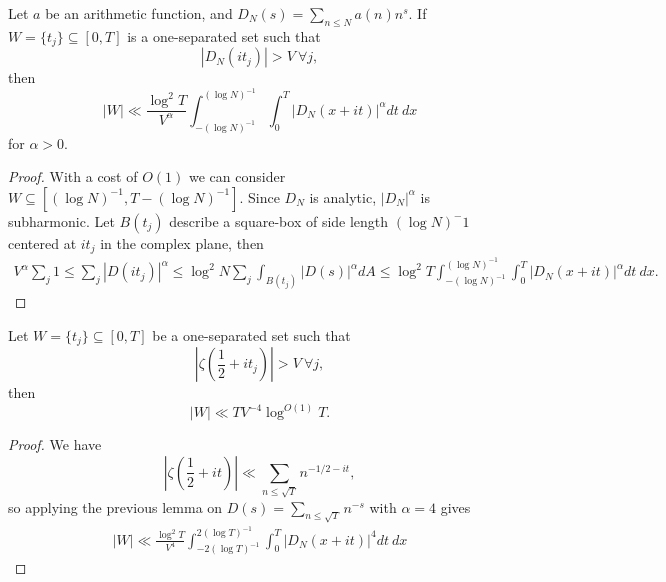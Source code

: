 \begin{lemma}
    Let $a$ be an arithmetic function, and $D_N(s)=\sum_{n\leq N}a(n)n^{s}.$
    If $W = \{t_j\}\subseteq [0,T]$ is a one-separated set such that \[
        |D_N(it_j)| > V \ \forall j,
    \]
    then \[
        |W|\ll \frac{\log^2 T}{V^\alpha} \int_{-(\log N)^{-1}}^{(\log N)^{-1}}
        \int_{0}^{T} |D_N(x+it)|^\alpha dt \ dx
        \]
    for $\alpha > 0$.
\end{lemma}
\begin{proof}
    With a cost of $O(1)$ we can consider $W\subseteq [(\log N)^{-1}, T-(\log N)^{-1}]$.
    Since $D_N$ is analytic, $|D_N|^\alpha$ is subharmonic. Let $B(t_j)$ describe a square-box of side length $(\log N)^-1$ centered at $it_j$ in the complex plane, then \begin{align*}
        V^\alpha \sum_{j} 1 \leq \sum_{j}|D(it_j)|^\alpha \leq \log^2 N \sum_{j} \int_{B(t_j)} |D(s)|^\alpha dA \leq \log^2 T \int_{-(\log N)^{-1}}^{(\log N)^{-1}}
        \int_{0}^{T} |D_N(x+it)|^\alpha dt \ dx.
    \end{align*}
\end{proof}

\begin{corollary} \label{halflinebigvalue}
   Let $W = \{t_j\}\subseteq [0,T]$ be a one-separated set such that \[
        \left|\zeta\left(\frac{1}{2}+it_j\right)\right|>V \ \forall j,
    \]
    then \[
    |W|\ll TV^{-4} \log^{O(1)}T.
    \]
\end{corollary}
\begin{proof}
    We have \[
        \left|\zeta\left(\frac{1}{2}+it\right)\right|\ll \sum_{n\leq \sqrt{T}}n^{-1/2-it},
    \]
    so applying the previous lemma on $D(s)=\sum_{n\leq \sqrt{T}}n^{-s}$ with $\alpha=4$ gives \begin{align*}
        |W|\ll \frac{\log ^2 T}{V^4} \int_{-2(\log T)^{-1}}^{2(\log T)^{-1}}
        \int_{0}^{T} |D_N(x+it)|^4 dt \ dx
    \end{align*}
\end{proof}

